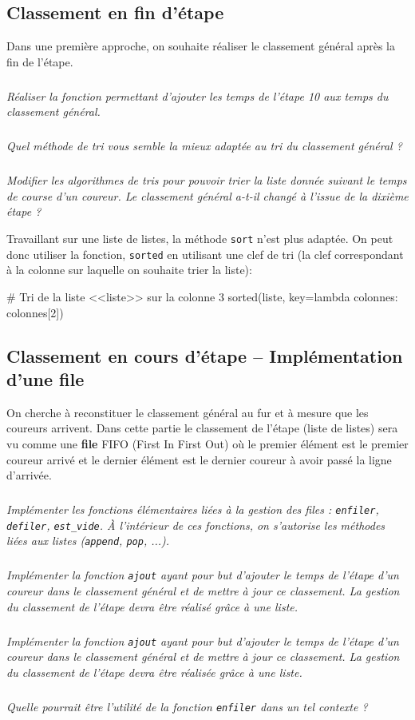 \documentclass[10pt,fleqn]{article} %
\begin{document}
\begin{multicols}{2}
\subsection*{Classement en fin d'étape}
Dans une première approche, on souhaite réaliser le classement général après la fin de l'étape. 

\subparagraph{}
\textit{Réaliser la fonction permettant d'ajouter les temps de l'étape 10 aux temps du classement général.}

\subparagraph{}
\textit{Quel méthode de tri vous semble la mieux adaptée au tri du classement général ?}

\subparagraph{}
\textit{Modifier les algorithmes de tris pour pouvoir trier la liste donnée suivant le temps de course d'un coureur. Le classement général a-t-il changé à l'issue de la dixième étape ?}

\begin{rem}
Travaillant sur une liste de listes, la méthode \texttt{sort} n'est plus adaptée. On peut donc utiliser la fonction, \texttt{sorted} en utilisant une clef de tri (la clef correspondant à la colonne sur laquelle on souhaite trier la liste): 
\end{rem}
\begin{python}
# Tri de la liste <<liste>> sur la colonne 3
sorted(liste, key=lambda colonnes: colonnes[2])
\end{python}



\subsection*{Classement en cours d'étape -- Implémentation d'une file}
On cherche à reconstituer le classement général au fur et à mesure que les coureurs arrivent. Dans cette partie le classement de l'étape (liste de listes) sera vu comme une \textbf{file} FIFO (First In First Out) où le premier élément est le premier coureur arrivé et le dernier élément est le dernier coureur à avoir passé la ligne d'arrivée.  

\subparagraph{}\textit{Implémenter les fonctions élémentaires liées à la gestion des files : \texttt{enfiler}, \texttt{defiler}, \texttt{est\_vide}. À l'intérieur de ces fonctions, on s'autorise les méthodes liées aux listes (\texttt{append}, \texttt{pop}, ...).}

\subparagraph{}
\textit{Implémenter la fonction \texttt{ajout} ayant pour but d'ajouter le temps de l'étape d'un coureur dans le classement général et de mettre à jour ce classement. La gestion du classement de l'étape devra être réalisé grâce à une liste.}

\subparagraph{}
\textit{Implémenter la fonction \texttt{ajout} ayant pour but d'ajouter le temps de l'étape d'un coureur dans le classement général et de mettre à jour ce classement. La gestion du classement de l'étape devra être réalisée grâce à une liste.}

\subparagraph{}
\textit{Quelle pourrait être l'utilité de la fonction \texttt{enfiler} dans un tel contexte ?}


\end{multicols}
\end{document}
